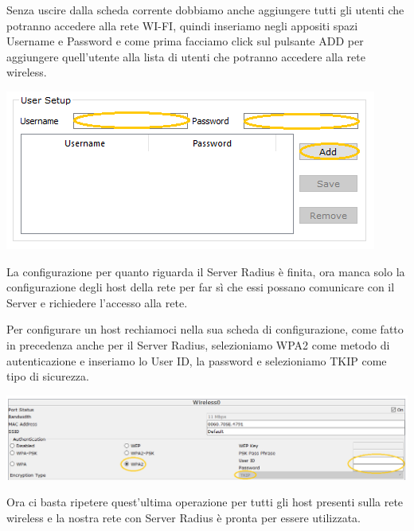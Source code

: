 Senza uscire dalla scheda corrente dobbiamo anche aggiungere tutti gli utenti che potranno accedere alla rete WI-FI, quindi inseriamo negli appositi spazi Username e Password e come prima facciamo click sul pulsante ADD per aggiungere quell’utente alla lista di utenti che potranno accedere alla rete wireless.

\begin{center}
    \includegraphics[width=\linewidth]{images/08.wireless/20.png}
\end{center}

La configurazione per quanto riguarda il Server Radius è finita, ora manca solo la configurazione degli host della rete per far sì che essi possano comunicare con il Server e richiedere l’accesso alla rete.

Per configurare un host rechiamoci nella sua scheda di configurazione, come fatto in precedenza anche per il Server Radius, selezioniamo WPA2 come metodo di autenticazione e inseriamo lo User ID, la password e selezioniamo TKIP come tipo di sicurezza.

\begin{center}
    \includegraphics[width=\linewidth]{images/08.wireless/21.png}
\end{center}

Ora ci basta ripetere quest’ultima operazione per tutti gli host presenti sulla rete wireless e la nostra rete con Server Radius è pronta per essere utilizzata.